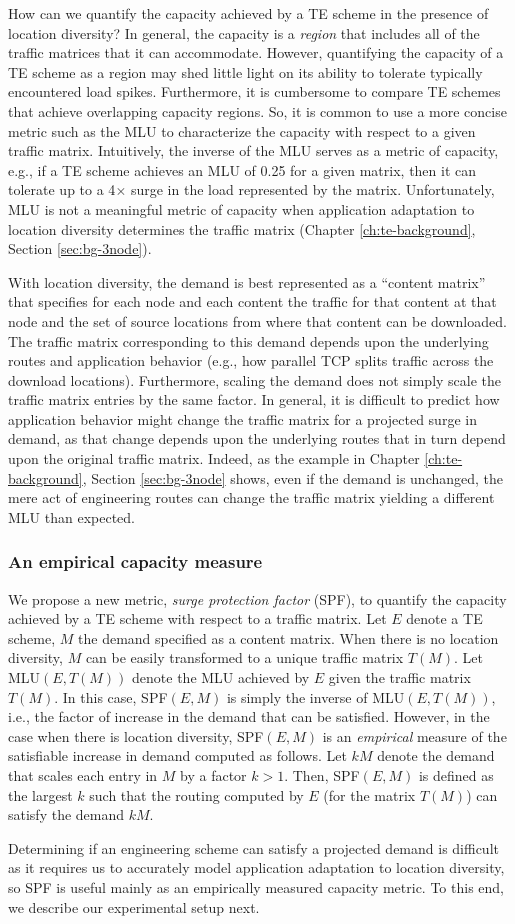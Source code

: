 How can we quantify the capacity achieved by a TE scheme in the presence of location diversity? In general, the capacity is a {\em region} that includes all of the traffic matrices that it can accommodate. However, quantifying the capacity of a TE scheme as a region may shed little light on its ability to tolerate typically encountered load spikes. Furthermore, it is cumbersome to compare TE schemes that achieve overlapping capacity regions. So, it is common to use a more concise metric such as the MLU to characterize the capacity with respect to a given traffic matrix. Intuitively, the inverse of the MLU serves as a metric of capacity, e.g., if a TE scheme achieves an MLU of 0.25 for a given matrix, then it can tolerate up to a 4$\times$ surge in the load represented by the matrix. Unfortunately, MLU is not a meaningful metric of capacity when application adaptation to location diversity  determines the traffic matrix (Chapter \ref{ch:te-background},  Section \ref{sec:bg-3node}).
  

With location diversity, the demand is best represented as a ``content matrix'' that specifies for each node and each content the traffic for that content at that node and the set of source locations from where that content can be downloaded. The traffic matrix corresponding to this demand depends upon the underlying routes and application behavior (e.g., how parallel TCP splits traffic across the download locations). Furthermore, scaling the demand does not simply scale the traffic matrix entries by the same factor. In general, it is difficult to predict how application behavior might change the traffic matrix for a projected surge in demand, as that change depends upon the underlying routes that in turn depend upon the original traffic matrix. Indeed, as the example in Chapter \ref{ch:te-background},  Section \ref{sec:bg-3node} shows, even if the demand is unchanged, the mere act of engineering routes can change the traffic matrix yielding a different MLU than expected.


\subsubsection{An empirical capacity measure}
\label{sec:SPFdefinition}

We propose a new metric, {\em surge protection factor} (SPF), to quantify the capacity achieved by a TE scheme with respect to a traffic matrix. Let $E$ denote a TE scheme, $M$ the demand specified as a content matrix. When there is no location diversity, $M$ can be easily transformed to a unique traffic matrix $T(M)$. Let  MLU$(E,T(M))$ denote the MLU achieved by $E$ given the traffic matrix $T(M)$. In this case, SPF$(E,M)$ is simply the inverse of MLU$(E,T(M))$, i.e., the factor of increase in the demand that can be satisfied. However, in the case when there is location diversity, SPF$(E,M)$ is an {\em empirical} measure of the satisfiable increase in demand computed as follows. Let $kM$ denote the demand that scales each entry in $M$ by a factor $k>1$. Then, SPF$(E,M)$ is defined as the largest $k$ such that the routing computed by $E$ (for the matrix $T(M)$) can satisfy the demand $kM$.

Determining if an engineering scheme can satisfy a projected demand is difficult as it requires us to accurately model application adaptation to location diversity, so SPF is useful mainly as an empirically measured capacity metric. To this end, we describe our experimental setup next.
